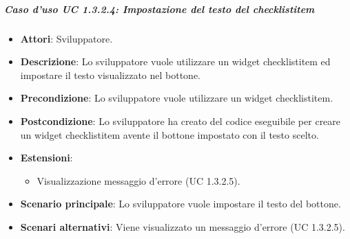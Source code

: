 \subparagraph{Caso d'uso UC 1.3.2.4: Impostazione del testo del checklistitem}
\FloatBarrier
\begin{itemize}
\item\textbf{Attori}: Sviluppatore.
\item\textbf{Descrizione}: Lo sviluppatore vuole utilizzare un widget checklistitem ed impostare il testo visualizzato nel bottone.
\item\textbf{Precondizione}: Lo sviluppatore vuole utilizzare un widget checklistitem.
\item\textbf{Postcondizione}: Lo sviluppatore ha creato del codice eseguibile per creare un widget checklistitem avente il bottone impostato con il testo scelto.
\item \textbf{Estensioni}: 
\begin{itemize}
\item Visualizzazione messaggio d'errore (UC 1.3.2.5).
\end{itemize}
\item \textbf{Scenario principale}: Lo sviluppatore vuole impostare il testo del bottone.
\item \textbf{Scenari alternativi}: Viene visualizzato un messaggio d'errore (UC 1.3.2.5).
\end{itemize}